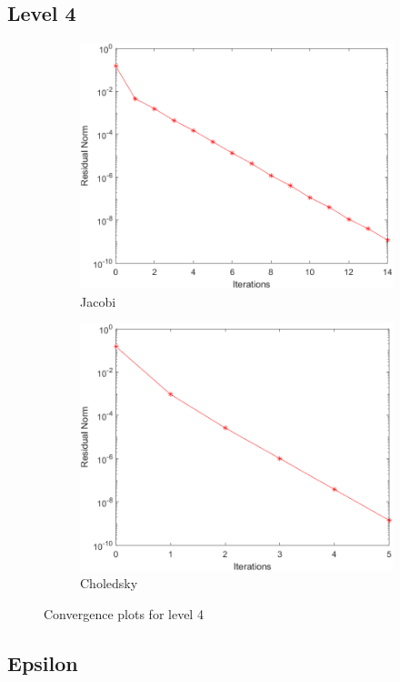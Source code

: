 \documentclass[a4paper, 11pt]{article}
\begin{document}
			\subsection*{Level 4}
				\begin{figure}[H]
					\begin{subfigure}{.49\textwidth}
						\centering
						\includegraphics[width=.99\linewidth]{img4/J.png}  
						\caption{Jacobi}
						\label{fig:Jacobi_4}
					\end{subfigure}
					\begin{subfigure}{.49\textwidth}
						\centering
						\includegraphics[width=.99\linewidth]{img4/C.png}  
						\caption{Choledsky}
						\label{fig:Chol_4}
					\end{subfigure}
					\caption{Convergence plots for level 4}
					\label{fig:fig4}
				\end{figure}
			
			\subsection{Epsilon}
	
	
	
\end{document}
